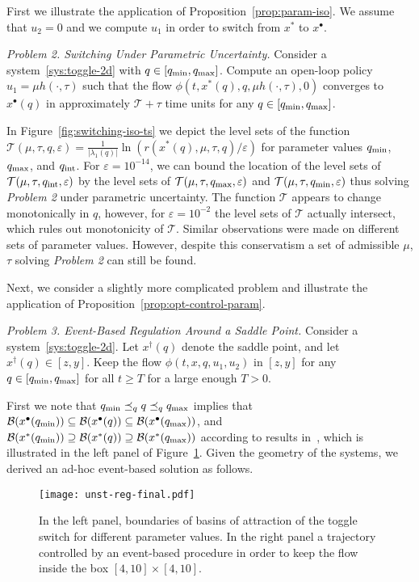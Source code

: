 \documentclass[letterpaper, 10pt, journal]{IEEEtran}  %
\newcommand{\cB}{{\mathcal B}}
\newcommand{\cT}{{\mathcal T}}
\begin{document}
First we illustrate the application of Proposition~\ref{prop:param-iso}. We assume that $u_2 = 0$ and we compute $u_1$ in order to switch from $x^\ast$ to $x^\bullet$.

\emph{Problem 2. Switching Under Parametric Uncertainty.} Consider a system~\eqref{sys:toggle-2d} with $q\in [q_{\rm min}, q_{\rm max}]$. Compute an open-loop policy $u_1=\mu h(\cdot,\tau)$ such that the flow $\phi(t,x^\ast(q), q, \mu h(\cdot,\tau), 0)$ converges to $x^\bullet(q)$ in approximately $\cT+\tau$ time units for any $q\in[q_{\rm min}, q_{\rm max}]$.

In Figure~\ref{fig:switching-iso-ts} we depict the level sets of the function $\cT(\mu, \tau, q, \varepsilon) = \frac{1}{|\lambda_1(q)|} \ln(r(x^\ast(q),\mu,\tau,q)/\varepsilon)$ for parameter values $q_{\rm min}$, $q_{\rm max}$, and $q_{\rm int}$. For $\varepsilon = 10^{-14}$, we can bound the location of the level sets  of $\cT(\mu, \tau, q_{\rm int}, \varepsilon)$ by the level sets of $\cT(\mu, \tau, q_{\rm max}, \varepsilon)$ and $\cT(\mu, \tau, q_{\rm min}, \varepsilon)$ thus solving \emph{Problem 2} under parametric uncertainty. The function $\cT$ appears to change monotonically in $q$, however, for $\varepsilon = 10^{-2}$ the level sets of $\cT$ actually intersect, which rules out monotonicity of $\cT$. Similar observations were made on different sets of parameter values. However, despite this conservatism a set of admissible $\mu$, $\tau$ solving \emph{Problem 2} can still be found.

Next, we consider a slightly more complicated problem and illustrate the application of Proposition~\ref{prop:opt-control-param}.
	
\emph{Problem 3. Event-Based Regulation Around a Saddle Point.} Consider a system~\eqref{sys:toggle-2d}.  Let $x^\dagger(q)$ denote the saddle point, and let $x^\dagger(q)\in[z, y]$. Keep the flow $\phi(t,x ,q, u_1, u_2)$ in $[z, y]$ for any $q\in [q_{\rm min}, q_{\rm max}]$ for all $t\ge T$ for a large enough $T>0$.

 First we note that $q_{\rm min}\preceq_q q \preceq_q q_{\rm max}$ implies that $\cB(x^\bullet(q_{\rm min}))\subseteq  \cB(x^\bullet(q)) \subseteq \cB(x^\bullet(q_{\rm max}))$, and  $\cB(x^\ast(q_{\rm min})) \supseteq \cB(x^\ast(q)) \supseteq \cB(x^\ast(q_{\rm max}))$ according to results in~\cite{sootla2016basins}, which is illustrated in the left panel of Figure~\ref{fig:unst-reg}. 
 Given the geometry of the systems, we derived an ad-hoc event-based solution as follows.
	\begin{figure}[t]
		\centering
		\texttt{[image: unst-reg-final.pdf]}
		\caption{In the left panel, boundaries of basins of attraction of the toggle switch for different parameter values. In the right panel a trajectory controlled by an event-based procedure in order to keep the flow inside the box $[4,10]\times[4, 10]$.} \label{fig:unst-reg}
	\end{figure}
\end{document}
